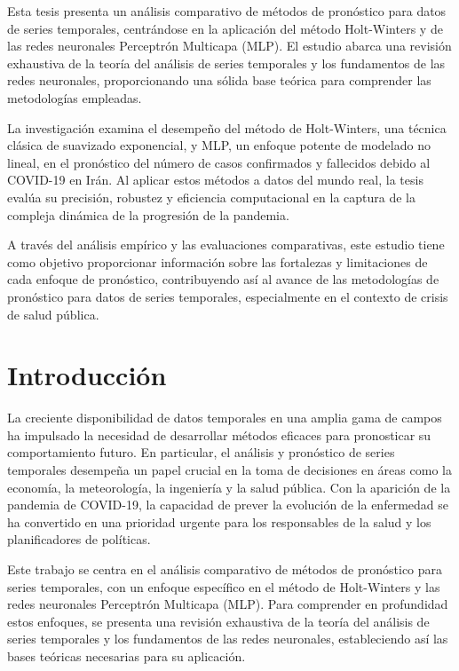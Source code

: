 \documentclass[
  us-letterpaper,
]{scrreprt}
\begin{document}

Esta tesis presenta un análisis comparativo de métodos de pronóstico
para datos de series temporales, centrándose en la aplicación del método
Holt-Winters y de las redes neuronales Perceptrón Multicapa (MLP). El
estudio abarca una revisión exhaustiva de la teoría del análisis de
series temporales y los fundamentos de las redes neuronales,
proporcionando una sólida base teórica para comprender las metodologías
empleadas.

La investigación examina el desempeño del método de Holt-Winters, una
técnica clásica de suavizado exponencial, y MLP, un enfoque potente de
modelado no lineal, en el pronóstico del número de casos confirmados y
fallecidos debido al COVID-19 en Irán. Al aplicar estos métodos a datos
del mundo real, la tesis evalúa su precisión, robustez y eficiencia
computacional en la captura de la compleja dinámica de la progresión de
la pandemia.

A través del análisis empírico y las evaluaciones comparativas, este
estudio tiene como objetivo proporcionar información sobre las
fortalezas y limitaciones de cada enfoque de pronóstico, contribuyendo
así al avance de las metodologías de pronóstico para datos de series
temporales, especialmente en el contexto de crisis de salud pública.


\chapter*{Introducción}\label{introducciuxf3n}


La creciente disponibilidad de datos temporales en una amplia gama de
campos ha impulsado la necesidad de desarrollar métodos eficaces para
pronosticar su comportamiento futuro. En particular, el análisis y
pronóstico de series temporales desempeña un papel crucial en la toma de
decisiones en áreas como la economía, la meteorología, la ingeniería y
la salud pública. Con la aparición de la pandemia de COVID-19, la
capacidad de prever la evolución de la enfermedad se ha convertido en
una prioridad urgente para los responsables de la salud y los
planificadores de políticas.

Este trabajo se centra en el análisis comparativo de métodos de
pronóstico para series temporales, con un enfoque específico en el
método de Holt-Winters y las redes neuronales Perceptrón Multicapa
(MLP). Para comprender en profundidad estos enfoques, se presenta una
revisión exhaustiva de la teoría del análisis de series temporales y los
fundamentos de las redes neuronales, estableciendo así las bases
teóricas necesarias para su aplicación.
\end{document}
